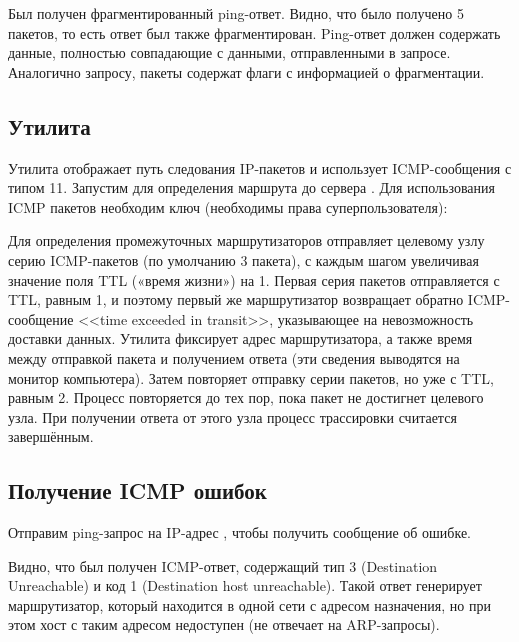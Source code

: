 Был получен фрагментированный ping-ответ. Видно, что было получено 5 пакетов, то есть ответ был также фрагментирован. Ping-ответ должен содержать данные, полностью совпадающие с данными, отправленными в запросе. Аналогично запросу, пакеты содержат флаги с информацией о фрагментации.

\subsection{Утилита }

Утилита  отображает путь следования IP-пакетов и использует ICMP-сообщения с типом 11. Запустим  для определения маршрута до сервера . Для использования ICMP пакетов необходим ключ  (необходимы права суперпользователя):



\vspace{-2.2em}

Для определения промежуточных маршрутизаторов  отправляет целевому узлу серию ICMP-пакетов (по умолчанию 3 пакета), с каждым шагом увеличивая значение поля TTL («время жизни») на 1. Первая серия пакетов отправляется с TTL, равным 1, и поэтому первый же маршрутизатор возвращает обратно ICMP-сообщение <<time exceeded in transit>>, указывающее на невозможность доставки данных. Утилита фиксирует адрес маршрутизатора, а также время между отправкой пакета и получением ответа (эти сведения выводятся на монитор компьютера). Затем  повторяет отправку серии пакетов, но уже с TTL, равным 2. Процесс повторяется до тех пор, пока пакет не достигнет целевого узла. При получении ответа от этого узла процесс трассировки считается завершённым.

\subsection{Получение ICMP ошибок}

Отправим ping-запрос на IP-адрес , чтобы получить сообщение об ошибке.




Видно, что был получен ICMP-ответ, содержащий тип 3 (Destination Unreachable) и код 1 (Destination host unreachable). Такой ответ генерирует маршрутизатор, который находится в одной сети с адресом назначения, но при этом хост с таким адресом недоступен (не отвечает на ARP-запросы).

